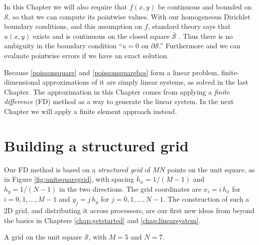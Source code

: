 In this Chapter we will also require that $f(x,y)$ be continuous and bounded on $\mathcal{S}$, so that we can compute its pointwise values.  With our homogeneous Dirichlet boundary conditions, and this assumption on $f$, standard theory says that $u(x,y)$ exists and is continuous on the closed square $\bar{\mathcal{S}}$ \citep[Theorem 6 in section 5.6]{Evans}.  Thus there is no ambiguity in the boundary condition ``$u=0$ on $\partial \mathcal{S}$.''  Furthermore and we can evaluate pointwise errors if we have an exact solution. 

Because \eqref{poissonsquare} and \eqref{poissonsquarebcs} form a linear problem, finite-dimensional approximations of it are simply linear systems, as solved in the last Chapter.  The approximation in this Chapter comes from applying a \emph{finite difference} (FD) method as a way to generate the linear system.  In the next Chapter we will apply a finite element approach instead.


\section{Building a structured grid}

Our FD method is based on a \emph{structured grid} of $MN$ points on the unit square, as in Figure \ref{fig:unitsquaregrid}, with spacing $h_x=1/(M-1)$ and $h_y=1/(N-1)$ in the two directions.  The grid coordinates are $x_i = i\, h_x$ for $i = 0,1,\dots,M-1$ and $y_j = j\, h_y$ for $j=0,1,\dots,N-1$.  The construction of such a 2D grid, and distributing it across processors, are our first new ideas from \PETSc beyond the basics in Chapters \ref{chap:getstarted} and \ref{chap:linearsystem}.

\begin{marginfigure}
\caption{A grid on the unit square $\mathcal{S}$, with $M=5$ and $N=7$.}
\label{fig:unitsquaregrid}
\end{marginfigure}

